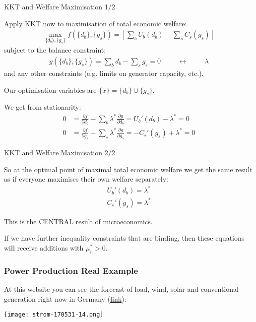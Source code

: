 \documentclass[10pt,dvipsnames]{beamer}
\def\l{\lambda}
\def\m{\mu}
\def\d{\partial}
\begin{document}
\begin{frame}{KKT and Welfare Maximisation 1/2}

  Apply KKT now to maximisation of total economic welfare:
  \begin{align*}
    \max_{\{d_b\}, \{g_s\}} f(\{d_b\}, \{g_s\}) = \left[ \sum_b U_b (d_b)  -  \sum_s C_s (g_s) \right]
  \end{align*}
  subject to the balance constraint:
  \begin{align*}
    g(\{d_b\}, \{g_s\}) = \sum_b d_b -  \sum_s g_s  = 0 \hspace{1cm} \leftrightarrow \hspace{1cm} \l
  \end{align*}
  and any other constraints (e.g. limits on generator capacity, etc.).

  Our optimisation variables are $\{x\} = \{d_b\} \cup \{g_s\}$.

  We get from stationarity:
  \begin{align*}
    0 & =   \frac{\d f}{\d d_b} - \sum_b \l^* \frac{\d g}{\d d_b} = U_b'(d_b) - \l^* = 0 \\
    0 & =   \frac{\d f}{\d g_s} - \sum_s \l^* \frac{\d g}{\d g_s} = -C_s'(g_s) + \l^* = 0
  \end{align*}


\end{frame}





\begin{frame}{KKT and Welfare Maximisation 2/2}

  So at the optimal point of maximal total economic welfare we get the
  same result as if everyone maximises their own welfare separately:
  \begin{align*}
 U_b'(d_b) =  \l^*  \\
 C_s'(g_s) = \l^*
  \end{align*}

  This is the CENTRAL result of microeconomics.

  If we have further inequality constraints that are binding, then
  these equations will receive additions with $\m_i^* > 0$.


\end{frame}



\begin{frame}[fragile]
  \frametitle{Power Production Real Example}

  At this website you can see the forecast of load, wind, solar and conventional generation right now in Germany (\href{https://energy-charts.de/power_de.htm}{link}):


  \centering
    \texttt{[image: strom-170531-14.png]}


\end{frame}
\end{document}
